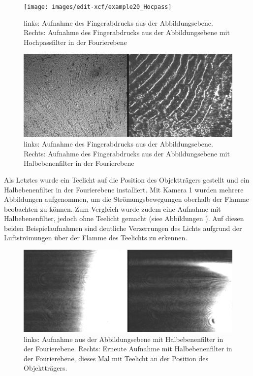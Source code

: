 \begin{figure}
\centering
\texttt{[image: images/edit-xcf/example20\_Hocpass]}
\caption{links: Aufnahme des Fingerabdrucks aus der Abbildungsebene. Rechts: Aufnahme des Fingerabdrucks aus der Abbildungsebene mit Hochpassfilter in der Fourierebene}
\label{fig:example20_Hochpass}
\end{figure}

\begin{figure}
\centering
\includegraphics[width=0.7\linewidth]{images/edit-xcf/example21_Halbebenenfilter}
\caption{links: Aufnahme des Fingerabdrucks aus der Abbildungsebene. Rechts: Aufnahme des Fingerabdrucks aus der Abbildungsebene mit Halbebenenfilter in der Fourierebene}
\label{fig:example21_Halbebenenfilter}
\end{figure}

Als Letztes wurde ein Teelicht auf die Position des Objektträgers gestellt und ein Halbebenenfilter in der Fourierebene installiert. Mit Kamera 1 wurden mehrere Abbildungen aufgenommen, um die Strömungsbewegungen oberhalb der Flamme beobachten zu können. Zum Vergleich wurde zudem eine Aufnahme mit Halbebenenfilter, jedoch ohne Teelicht gemacht (siee Abbildungen ). Auf diesen beiden Beispielaufnahmen sind deutliche Verzerrungen des Lichts aufgrund der Luftströmungen über der Flamme des Teelichts zu erkennen. 

\begin{figure}
\centering
\includegraphics[width=0.7\linewidth]{images/edit-xcf/example23_Halbebenenfilter_mit_und_ohne_Teelicht}
\caption{links: Aufnahme aus der Abbildungsebene mit Halbebenenfilter in der Fourierebene. Rechts: Erneute Aufnahme mit Halbebenenfilter in der Fourierebene, dieses Mal mit Teelicht an der Position des Objektträgers.}
\label{fig:example23_Halbebenenfilter_mit_und_ohne_Teelicht}
\end{figure}

